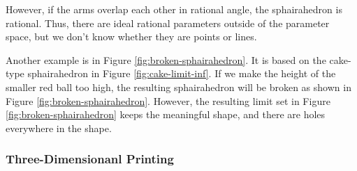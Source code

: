 However, if the arms overlap each other in rational angle, the
sphairahedron is rational.
Thus, there are ideal rational parameters outside of the parameter
space, but we don't know whether they are points or lines.

Another example is in Figure \ref{fig:broken-sphairahedron}.
It is based on the cake-type sphairahedron in Figure \ref{fig:cake-limit-inf}.
If we make the height of the smaller red ball too high, the resulting
sphairahedron will be broken as shown in Figure
\ref{fig:broken-sphairahedron}.
However, the resulting limit set in Figure
\ref{fig:broken-sphairahedron} keeps the
meaningful shape, and there are holes everywhere in the shape.

\subsubsection{Three-Dimensionanl Printing}

